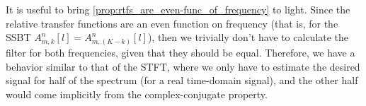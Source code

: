 %

It is useful to bring \cref{prop:rtfs_are_even-func_of_frequency} to light. Since the relative transfer functions are an even function on frequency (that is, for the SSBT $A_{m,k}^n[l] = A_{m,(K-k)}^n[l]$), then we trivially don't have to calculate the filter for both frequencies, given that they should be equal. Therefore, we have a behavior similar to that of the STFT, where we only have to estimate the desired signal for half of the spectrum (for a real time-domain signal), and the other half would come implicitly from the complex-conjugate property.
